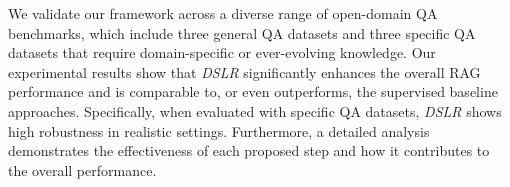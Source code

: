 
We validate our framework across a diverse range of open-domain QA benchmarks, which include three general QA datasets and three specific QA datasets that require domain-specific or ever-evolving knowledge.
Our experimental results show that \textit{DSLR} significantly enhances the overall RAG performance and is comparable to, or even outperforms, the supervised baseline approaches.
Specifically, when evaluated with specific QA datasets, \textit{DSLR} shows high robustness in realistic settings.
Furthermore, a detailed analysis demonstrates the effectiveness of each proposed step and how it contributes to the overall performance.

